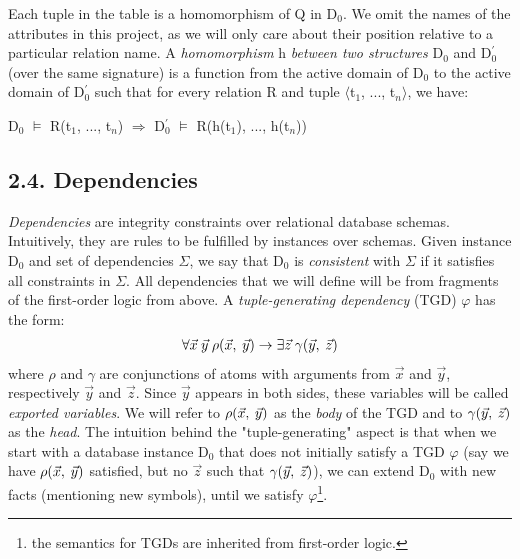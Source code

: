 \documentclass[11pt, a4paper, dvipsnames]{article}
\begin{document}
\noindent Each tuple in the table is a homomorphism of Q in D$_{0}$. We omit the names of the attributes in this project, as we will only care about their position relative to a particular relation name.\newline
A \textit{homomorphism} h \textit{between two structures} D$_{0}$ and D$^{'}_{0}$ (over the same signature) is a function from the active domain of D$_{0}$ to the active domain of D$^{'}_{0}$ such that for every relation R and tuple $\langle$t$_{1}$, ..., t$_{n}\rangle$, we have:
\begin{center}
D$_{0}$ $\vDash$ R(t$_{1}$, ..., t$_{n}$) $\Rightarrow$  D$^{'}_{0}$ $\vDash$ R(h(t$_{1}$), ..., h(t$_{n}$))
\end{center}

\subsection{2.4. Dependencies}
\textit{Dependencies} are integrity constraints over relational database schemas. Intuitively, they are rules to be fulfilled by instances over schemas. Given instance D$_{0}$ and set of dependencies $\Sigma$, we say that D$_{0}$ is \textit{consistent} with $\Sigma$ if it satisfies all constraints in $\Sigma$. All dependencies that we will define will be from fragments of the first-order logic from above.\newline
A \textit{tuple-generating dependency} (TGD) $\varphi$ has the form:
\begin{gather}
\forall \vec{x} \hspace{0.25em}\vec{y} \hspace{0.25em}\rho(\vec{x}, \hspace{0.25em}\vec{y}) \rightarrow \exists \vec{z} \hspace{0.25em}\gamma(\vec{y}, \hspace{0.25em}\vec{z})
\end{gather}
where $\rho$ and $\gamma$ are conjunctions of atoms with arguments from $\vec{x}$ and $\vec{y}$, respectively $\vec{y}$ and $\vec{z}$. Since $\vec{y}$ appears in both sides, these variables will be called \textit{exported variables}. We will refer to $\rho(\vec{x}, \hspace{0.25em} \vec{y})$ as the \textit{body} of the TGD and to $\gamma(\vec{y}, \hspace{0.25em}\vec{z})$ as the \textit{head}.\newline
The intuition behind the "tuple-generating" aspect is that when we start with a database instance D$_{0}$ that does not initially satisfy a TGD $\varphi$ (say we have $\rho(\vec{x}, \hspace{0.25em} \vec{y})$ satisfied, but no $\vec{z}$ such that $\gamma(\vec{y}, \hspace{0.25em}\vec{z})$), we can extend D$_{0}$ with new facts (mentioning new symbols), until we satisfy $\varphi$\footnote{the semantics for TGDs are inherited from first-order logic.}.\newline
\end{document}
